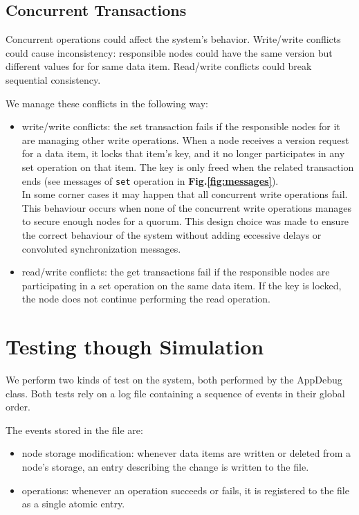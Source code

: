 \documentclass{article}
\begin{document}
\subsection{Concurrent Transactions}
Concurrent operations could affect the system's behavior. Write/write
conflicts could cause inconsistency: responsible nodes could have the same version
but different values for for same data item. Read/write conflicts could break
sequential consistency.

We manage these conflicts in the following way:
\begin{itemize}
    \item write/write conflicts: the set transaction fails if the responsible 
    nodes for it are managing other write operations. When a node receives 
    a version request for a data item, it locks that item's key, and it no longer
    participates in any set operation on that item.
    The key is only freed when the related transaction ends (see messages of
    \texttt{set} operation in \textbf{Fig.\ref{fig:messages}}). \\
    In some corner cases it may happen that all concurrent write operations fail.
    This behaviour occurs when none of the concurrent write operations manages to
    secure enough nodes for a quorum. This design choice was made to ensure the
    correct behaviour of the system without adding eccessive delays or convoluted
    synchronization messages.
    \item read/write conflicts: the get transactions fail if the responsible
    nodes are participating in a set operation on the same data item. If the
    key is locked, the node does not continue performing the read operation.
\end{itemize}

\section{Testing though Simulation}
We perform two kinds of test on the system, both performed by the AppDebug class. 
Both tests rely on a log file containing a sequence of events in their global order.

The events stored in the file are:
\begin{itemize}
    \item node storage modification: whenever data items are written or deleted 
    from a node's storage, an entry describing the change is written to the file.
    \item operations: whenever an operation succeeds or fails, it is registered 
    to the file as a single atomic entry.
\end{itemize}
\end{document}
